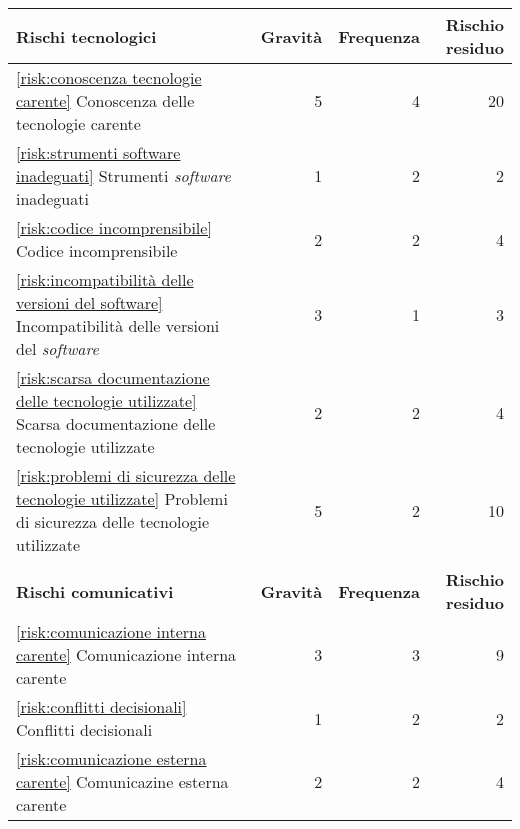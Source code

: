 \begin{table}[H]
	\centering

	\begin{tabular}{l|r|r|r}
		\hline
		\textbf{Rischi tecnologici}                                                          & \textbf{Gravità} & \textbf{Frequenza} & \textbf{Rischio residuo} \\
		\hline
		\autoref{risk:conoscenza tecnologie carente} Conoscenza delle tecnologie carente     & 5                & 4                  & 20                       \\
		\autoref{risk:strumenti software inadeguati} Strumenti \textit{software} inadeguati           & 1                & 2                  & 2                        \\
		\autoref{risk:codice incomprensibile} Codice incomprensibile                         & 2                & 2                  & 4                        \\
		\autoref{risk:incompatibilità delle versioni del software} 
		Incompatibilità delle versioni del \textit{software}											 & 3                & 1                  & 3                        \\
		\autoref{risk:scarsa documentazione delle tecnologie utilizzate} 
		Scarsa documentazione delle tecnologie utilizzate	   								 & 2                & 2                  & 4                        \\
		\autoref{risk:problemi di sicurezza delle tecnologie utilizzate} 
		Problemi di sicurezza delle tecnologie utilizzate	   								 & 5                & 2                  & 10                        \\
		\hline
		\multicolumn{4}{l}{}                                                                                                                                    \\
		\hline
		\textbf{Rischi comunicativi}                                                         & \textbf{Gravità} & \textbf{Frequenza} & \textbf{Rischio residuo} \\
		\hline
		\autoref{risk:comunicazione interna carente} Comunicazione interna carente           & 3                & 3                  & 9                        \\
		\autoref{risk:conflitti decisionali} Conflitti decisionali                           & 1                & 2                  & 2                        \\
		\autoref{risk:comunicazione esterna carente} Comunicazine esterna carente            & 2                & 2                  & 4                        \\

\end{tabular}
\end{table}
